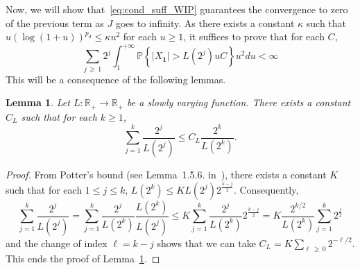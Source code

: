 \documentclass[10pt]{amsart}
\newtheorem{lemm}[theo]{Lemma}\newtheorem{prop}[theo]{Proposition}\newtheorem{coro}[theo]{Corollary}\newtheorem{conj}[theo]{Conjecture}
\theoremstyle{definition}\newtheorem{defi}[theo]{Definition}\newtheorem{rema}[theo]{Remark}\newtheorem{exam}[theo]{Example}\newtheorem{exem}[theo]{Example}\newtheorem{nota}[theo]{Notation}
\newcommand\R{\mathbb{R}}
\newcommand\PP{\mathbb{P}}
\newcommand{\pr}[1]{(#1)}
\newcommand{\gr}[1]{\bm{#1}}
\begin{document}
Now, we will show that~\eqref{eq:cond_suff_WIP} guarantees the convergence to zero of the previous term as $J$ goes to infinity. As there exists a constant $\kappa$ such that $u\pr{\log\pr{1+u}}^{p_d}\leq \kappa u^2$ for each $u\geq 1$, it suffices to prove that for each $C$,
\begin{equation}
\sum_{j\,\geq\,1}2^j\int_1^{+\infty}\PP\left\{\left|X_{\gr{1}}\right|>L\left(2^j\right)uC\right\} u^{2}du<\infty
\end{equation}
This will be a consequence of the following lemmas.

\begin{lemm}\label{lem:slowly_varying_2j_sur_L2j}
Let $L\colon \R_{+}\to \R_{+}$ be a slowly varying function. There exists a constant $C_L$ such that for each $k\geq 1$,
\begin{equation}\label{eq:slowly_varying_2j_sur_L2j}
\sum_{j=1}^k\frac{2^j}{L\left(2^j\right)}\leq C_L\frac{2^k}{L\left(2^k\right)}.
\end{equation}
\end{lemm}

\begin{proof}
From Potter's bound (see Lemma~1.5.6. in~\cite{MR1015093}), there exists a constant $K$ such that for each $1\leq j\leq k$, $L\pr{2^k} \leq K L\pr{2^j} 2^{\frac{k-j}2}$. Consequently,
\begin{equation}
\sum_{j=1}^k\frac{2^j}{L\left(2^j\right)} =\sum_{j=1}^k\frac{2^j}{L\left(2^k\right)}\frac{L\left(2^k\right)}{L\left(2^j\right)}\leq K\sum_{j=1}^k\frac{2^j}{L\left(2^k\right)}2^{\frac{k-j}2}=K\frac{2^{k/2}}{L\left(2^k\right)}\sum_{j=1}^k2^{\frac j2}
\end{equation}
and the change of index $\ell=k-j$ shows that we can take $C_L=K\sum_{\ell\,\geq\,0}2^{-\ell/2}$. This ends the proof of Lemma~\ref{lem:slowly_varying_2j_sur_L2j}.
\end{proof}
\end{document}
